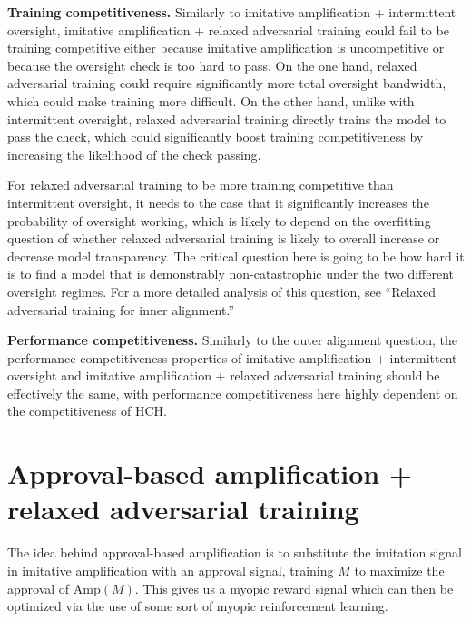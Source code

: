 \textbf{Training competitiveness.} Similarly to imitative amplification + intermittent oversight, imitative amplification + relaxed adversarial training could fail to be training competitive either because imitative amplification is uncompetitive or because the oversight check is too hard to pass. On the one hand, relaxed adversarial training could require significantly more total oversight bandwidth, which could make training more difficult. On the other hand, unlike with intermittent oversight, relaxed adversarial training directly trains the model to pass the check, which could significantly boost training competitiveness by increasing the likelihood of the check passing.

For relaxed adversarial training to be more training competitive than intermittent oversight, it needs to the case that it significantly increases the probability of oversight working, which is likely to depend on the overfitting question of whether relaxed adversarial training is likely to overall increase or decrease model transparency. The critical question here is going to be how hard it is to find a model that is demonstrably non-catastrophic under the two different oversight regimes. For a more detailed analysis of this question, see ``Relaxed adversarial training for inner alignment\cite{TODO: cite https://www.alignmentforum.org/posts/9Dy5YRaoCxH9zuJqa/relaxed-adversarial-training-for-inner-alignment}.''

\textbf{Performance competitiveness.} Similarly to the outer alignment question, the performance competitiveness properties of imitative amplification + intermittent oversight and imitative amplification + relaxed adversarial training should be effectively the same, with performance competitiveness here highly dependent on the competitiveness of HCH.

\section{Approval-based amplification + relaxed adversarial training}
\label{sec:4}

The idea behind approval-based amplification is to substitute the imitation signal in imitative amplification with an approval signal, training $M$ to maximize the approval of $\text{Amp}(M)$. This gives us a myopic reward signal which can then be optimized via the use of some\cite{TODO: cite https://arxiv.org/abs/1709.10163} sort\cite{TODO: cite https://arxiv.org/abs/1902.04257} of myopic reinforcement learning.

